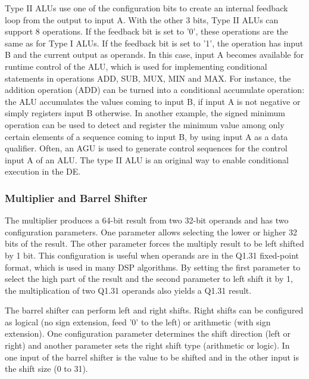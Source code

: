 \documentclass[journal]{IEEEtran}
\begin{document}
Type II ALUs use one of the configuration bits to create an internal
feedback loop from the output to input A. With the other 3 bits, Type
II ALUs can support 8 operations. If the feedback bit is set to '0',
these operations are the same as for Type I ALUs. If the feedback bit
is set to '1', the operation has input B and the current output as
operands. In this case, input A becomes available for runtime control
of the ALU, which is used for implementing conditional statements in
operations ADD, SUB, MUX, MIN and MAX. For instance, the addition
operation (ADD) can be turned into a conditional accumulate operation:
the ALU accumulates the values coming to input B, if input A is not
negative or simply registers input B otherwise. In another example,
the signed minimum operation can be used to detect and register the
minimum value among only certain elements of a sequence coming to
input B, by using input A as a data qualifier. Often, an AGU is used
to generate control sequences for the control input A of an ALU. The
type II ALU is an original way to enable conditional execution in the
DE.

\subsubsection{Multiplier and Barrel Shifter}
\label{subsection:multiplierBarrelShifter}

The multiplier produces a 64-bit result from two 32-bit operands and
has two configuration parameters. One parameter allows selecting the
lower or higher 32 bits of the result. The other parameter forces the
multiply result to be left shifted by 1 bit. This configuration is
useful when operands are in the Q1.31 fixed-point format, which is
used in many DSP algorithms. By setting the first parameter to select
the high part of the result and the second parameter to left shift it
by 1, the multiplication of two Q1.31 operands also yields a Q1.31
result.

The barrel shifter can perform left and right shifts. Right shifts can
be configured as logical (no sign extension, feed '0' to the left) or
arithmetic (with sign extension). One configuration parameter
determines the shift direction (left or right) and another parameter
sets the right shift type (arithmetic or logic). In one input of the
barrel shifter is the value to be shifted and in the other input is
the shift size (0 to 31).

\end{document}
